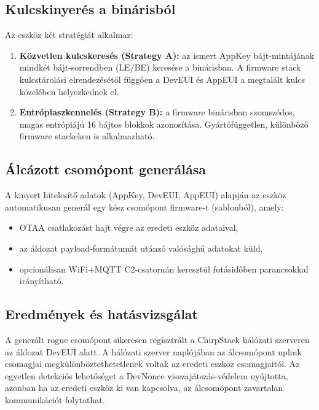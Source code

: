 \documentclass[12pt,a4paper]{article}
\begin{document}
\subsection{Kulcskinyerés a binárisból}

Az eszköz két stratégiát alkalmaz:

\begin{enumerate}
    \item \textbf{Közvetlen kulcskeresés (Strategy A):} az ismert AppKey
    bájt-mintájának mindkét bájt-sorrendben (LE/BE) keresése a binárisban.
    A firmware stack kulcstárolási elrendezésétől függően a DevEUI és AppEUI
    a megtalált kulcs közelében helyezkednek el.

    \item \textbf{Entrópiaszkennelés (Strategy B):} a firmware binárisban
    szomszédos, magas entrópiájú 16 bájtos blokkok azonosítása.
    Gyártófüggetlen, különböző firmware stackeken is alkalmazható.
\end{enumerate}

\subsection{Álcázott csomópont generálása}

A kinyert hitelesítő adatok (AppKey, DevEUI, AppEUI) alapján az eszköz
automatikusan generál egy kész csomópont firmware-t (sablonból), amely:
\begin{itemize}
    \item OTAA csatlakozást hajt végre az eredeti eszköz adataival,
    \item az áldozat payload-formátumát utánzó valósághű adatokat küld,
    \item opcionálisan WiFi+MQTT C2-csatornán keresztül futásidőben
    parancsokkal irányítható.
\end{itemize}

\subsection{Eredmények és hatásvizsgálat}

A generált rogue csomópont sikeresen regisztrált a ChirpStack hálózati
szerveren az áldozat DevEUI alatt. A hálózati szerver naplójában az
álcsomópont uplink csomagjai megkülönböztethetetlenek voltak az eredeti
eszköz csomagjaitól. Az egyetlen detekciós lehetőséget a DevNonce
visszajátszás-védelem nyújtotta, azonban ha az eredeti eszköz ki van
kapcsolva, az álcsomópont zavartalan kommunikációt folytathat.
\end{document}
